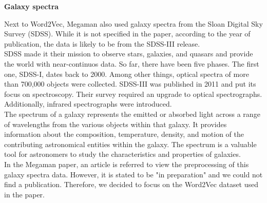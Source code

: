 




\textbf{Galaxy spectra} \cite{galaxies} \cite{Spectra}

Next to Word2Vec, Megaman also used galaxy spectra from the Sloan Digital Sky Survey (SDSS). While it is not specified in the paper, according to the year of publication, the data is likely to be from the SDSS-III release. \\

SDSS made it their mission to observe stars, galaxies, and quasars and provide the world with near-continuos data. So far, there have been five phases. The first one, SDSS-I, dates back to 2000. Among other things, optical spectra of more than 700,000 objects were collected. SDSS-III was published in 2011 and put its focus on spectroscopy. Their survey required an upgrade to optical spectrographs. Additionally, infrared spectrographs were introduced. \\

The spectrum of a galaxy represents the emitted or absorbed light across a range of wavelengths from the various objects within that galaxy. It provides information about the composition, temperature, density, and motion of the contributing astronomical entities within the galaxy. The spectrum is a valuable tool for astronomers to study the characteristics and properties of galaxies. \\

In the Megaman paper, an article is referred to view the preprocessing of this galaxy spectra data. However, it is stated to be "in preparation" and we could not find a publication. Therefore, we decided to focus on the Word2Vec dataset used in the paper. 